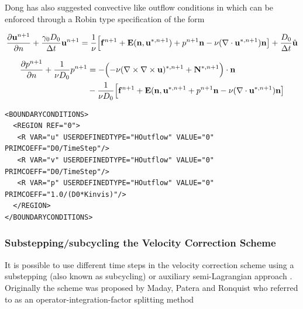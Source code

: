 Dong has also suggested convective like outflow conditions in
\cite{Dong15} which can be enforced through a Robin type specification
of the form

\begin{equation}
  \frac{\partial \mathbf{u}^{n+1}}{\partial n} + \frac{\gamma_0 D_0}{\Delta t} \mathbf{u}^{n+1} = \frac{1}{\nu}\Bigl[\mathbf{f}^{n+1} + \mathbf{E}(\mathbf{n},\mathbf{u}^{*,n+1}) + p^{n+1}\mathbf{n} -\nu(\nabla\cdot \mathbf{u}^{*,n+1}) \mathbf{n}
    \bigr] + \frac{D_0}{\Delta t}\hat{\mathbf{u}}
 \end{equation}

\begin{align}
  \frac{\partial p^{n+1}}{\partial n} + \frac{1}{\nu D_0} p^{n+1} &=
   - \Bigl( -\nu (\nabla \times \nabla \times   \mathbf{u})^{*,n+1} + \mathbf{N}^{*,n+1}\Bigr)\cdot \mathbf{n} \nonumber \\
 & - \frac{1}{\nu D_0}\Bigl[\mathbf{f}^{n+1} + \mathbf{E}(\mathbf{n},\mathbf{u}^{*,n+1} + p^{n+1}\mathbf{n} -\nu(\nabla\cdot \mathbf{u}^{*,n+1}) \mathbf{n}
   \bigr] 
 \end{align}


\begin{lstlisting}[style=XMLStyle]
<BOUNDARYCONDITIONS>
  <REGION REF="0">
   <R VAR="u" USERDEFINEDTYPE="HOutflow" VALUE="0" PRIMCOEFF="D0/TimeStep"/>
   <R VAR="v" USERDEFINEDTYPE="HOutflow" VALUE="0" PRIMCOEFF="D0/TimeStep"/>
   <R VAR="p" USERDEFINEDTYPE="HOutflow" VALUE="0" PRIMCOEFF="1.0/(D0*Kinvis)"/>
  </REGION>
</BOUNDARYCONDITIONS>
\end{lstlisting}

\subsubsection{Substepping/subcycling the Velocity Correction Scheme}

It is possible to use different time steps in the velocity correction
scheme using a substepping (also known as subcycling) \cite{Sh03} or
auxiliary semi-Lagrangian approach \cite{XiShDoKa}. Originally the
scheme was proposed by Maday, Patera and Ronquist who referred to as
an operator-integration-factor splitting method \cite{MaPaRo}

